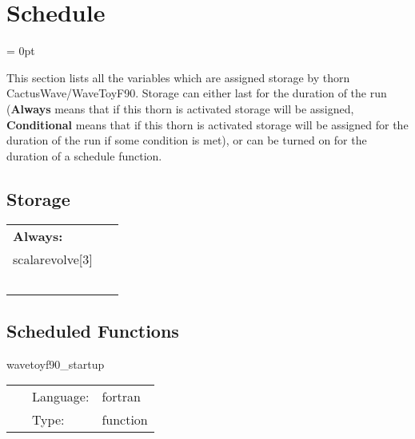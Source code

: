 
\section{Schedule} 


\parskip = 0pt


\noindent This section lists all the variables which are assigned storage by thorn CactusWave/WaveToyF90.  Storage can either last for the duration of the run ({\bf Always} means that if this thorn is activated storage will be assigned, {\bf Conditional} means that if this thorn is activated storage will be assigned for the duration of the run if some condition is met), or can be turned on for the duration of a schedule function.


\subsection*{Storage}

\hspace{5mm}

 \begin{tabular*}{160mm}{ll} 

{\bf Always:}&  ~ \\ 
 scalarevolve[3] & ~\\ 
~ & ~\\ 
\end{tabular*} 


\subsection*{Scheduled Functions}
\vspace{5mm}


\hspace{5mm} wavetoyf90\_startup 

\hspace{5mm}{\it register banner } 


\hspace{5mm}

 \begin{tabular*}{160mm}{cll} 
~ & Language:  & fortran \\ 
~ & Type:  & function \\ 
\end{tabular*} 


\vspace{5mm}


